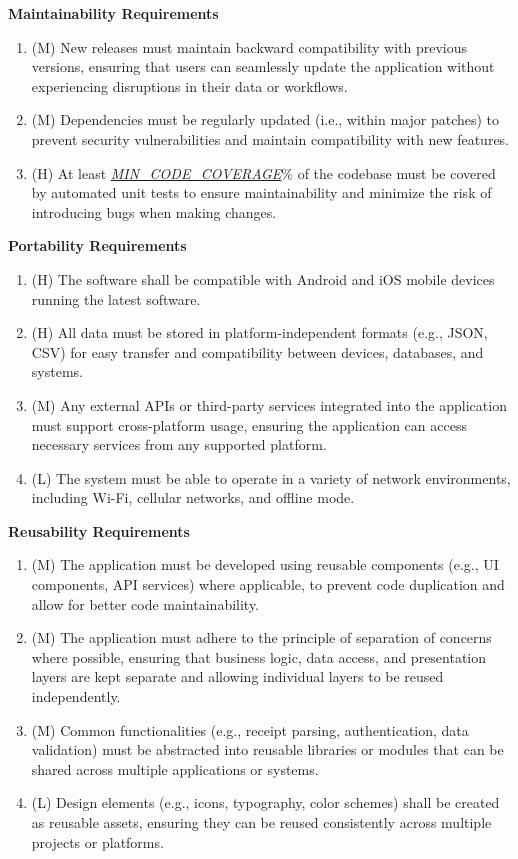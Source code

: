 \documentclass[12pt]{article}
\begin{document}
\textbf{Maintainability Requirements}
\begin{enumerate}[label=NFR-MTB-\arabic*]
  \item (M) New releases must maintain backward compatibility with previous
  versions, ensuring that users can seamlessly update the application without
  experiencing disruptions in their data or workflows.
  \item (M) Dependencies must be regularly updated (i.e., within major patches)
  to prevent security vulnerabilities and maintain compatibility with new
  features.
  \item (H) At least
  \hyperref[Table:AuxConstants]{\textit{MIN\_CODE\_COVERAGE}}\% of the codebase
  must be covered by automated unit tests to ensure maintainability and minimize
  the risk of introducing bugs when making changes.
\end{enumerate}

\textbf{Portability Requirements}
\begin{enumerate}[label=NFR-PORT-\arabic*]
  \item (H) The software shall be compatible with Android and iOS mobile devices
  running the latest software.
  \item (H) All data must be stored in platform-independent formats (e.g., JSON,
  CSV) for easy transfer and compatibility between devices, databases, and
  systems.
  \item (M) Any external APIs or third-party services integrated into the
  application must support cross-platform usage, ensuring the application can
  access necessary services from any supported platform.
  \item (L) The system must be able to operate in a variety of network
  environments, including Wi-Fi, cellular networks, and offline mode.
\end{enumerate}

\textbf{Reusability Requirements} 
\begin{enumerate}[label=NFR-REUS-\arabic*]
  \item (M) The application must be developed using reusable components (e.g.,
  UI components, API services) where applicable, to prevent code duplication and
  allow for better code maintainability.
  \item (M) The application must adhere to the principle of separation of
  concerns where possible, ensuring that business logic, data access, and
  presentation layers are kept separate and allowing individual layers to be
  reused independently.
  \item (M) Common functionalities (e.g., receipt parsing, authentication, data
  validation) must be abstracted into reusable libraries or modules that can be
  shared across multiple applications or systems.
  \item (L) Design elements (e.g., icons, typography, color schemes) shall be
  created as reusable assets, ensuring they can be reused consistently across
  multiple projects or platforms.
\end{enumerate}
\end{document}
